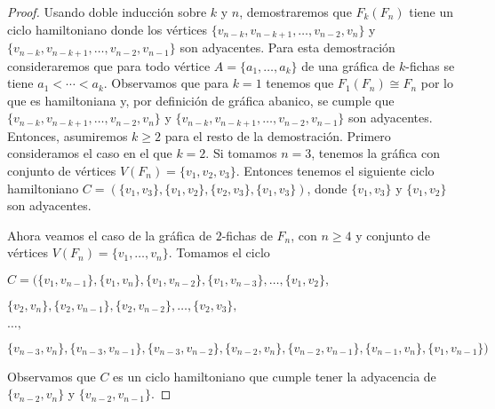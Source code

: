         
        \begin{proof}
            Usando doble inducci\'on sobre $k$ y $n$, demostraremos que
            $F_k(F_n)$ tiene un ciclo hamiltoniano donde los v\'ertices
            $\{v_{n-k}, v_{n-k+1}, \dots, v_{n-2}, v_n\}$ y $\{v_{n-k},
            v_{n-k+1}, \dots, v_{n-2}, v_{n-1}\}$ son adyacentes. Para esta
            demostraci\'on consideraremos que para todo v\'ertice $A = \{a_1,
            \dots, a_k\}$ de una gr\'afica de $k$-fichas se tiene $a_1 < \cdots
            < a_k$. Observamos que para $k =1$ tenemos que $F_1(F_n) \cong F_n$
            por lo que es hamiltoniana y, por definici\'on de gr\'afica abanico,
            se cumple que $\{v_{n-k}, v_{n-k+1}, \dots, v_{n-2}, v_n\}$ y
            $\{v_{n-k}, v_{n-k+1}, \dots, v_{n-2}, v_{n-1}\}$ son adyacentes.
            Entonces, asumiremos $k \geq 2$ para el resto de la demostraci\'on.
            Primero consideramos el caso en el que $k =2$. Si tomamos $n = 3$,
            tenemos la gr\'afica con conjunto de v\'ertices $V(F_n)=\{v_1, v_2,
            v_3\}$. Entonces tenemos el siguiente ciclo hamiltoniano $C=
            (\{v_1,v_3\},\{v_1,v_2\},\{v_2,v_3\}, \{v_1,v_3\})$, donde $\{v_1,
            v_3\}$ y $\{v_1, v_2\}$ son adyacentes. 
            
            Ahora veamos el caso de la gr\'afica de $2$-fichas de $F_n$, con $n
            \geq 4$ y conjunto de v\'ertices $V(F_n)=\{v_1,\dots, v_n\}$.
            Tomamos el ciclo
    
            $C = (\{v_1, v_{n-1}\},\{v_1, v_n\},\{v_1, v_{n-2}\}, \{v_1,
            v_{n-3}\}, \dots, \{v_1, v_2\},$
            
            $\{v_2, v_n\}, \{v_2, v_{n-1}\}, \{v_2, v_{n-2}\},
            \dots, \{v_2, v_3\},$
    
            $ \dots,$
    
            $\{v_{n-3},v_n\}, \{v_{n-3}, v_{n-1}\},\{v_{n-3},v_{n-2}\},
            \{v_{n-2}, v_n\},\{v_{n-2}, v_{n-1}\}, \{v_{n-1}, v_n\}, \{v_1,
            v_{n-1}\})$
    
            Observamos que $C$ es un ciclo hamiltoniano que cumple tener la
            adyacencia de  $\{v_{n-2}, v_n\}$ y $\{v_{n-2}, v_{n-1}\}$. 
    

\end{proof}
